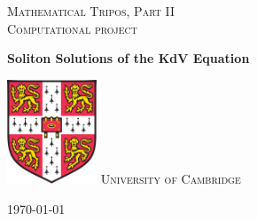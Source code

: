 \documentclass[a4paper,11pt]{article}
\begin{document}
\lstset{language = Matlab}
\begin{titlepage} %
	
	\center %
	
	\vspace*{3cm}

	\textsc{Mathematical Tripos, Part II}\\
	\textsc{Computational project}
	\begin{center}
      {\huge\bfseries Soliton Solutions of the KdV Equation\\[0.4cm]
}     \end{center}
	
	\vfill
	\vfill\vfill\vfill\vfill
	\includegraphics*[width = 2.675cm, height = 3.1cm]{coat.png}
	\vfill
    \textsc{University of Cambridge}
	
	\vspace*{\fill}
	\vfill
	{\large\today} 
	\vfill
	
\end{titlepage}
\setcounter{tocdepth}{3}
\tableofcontents
\newpage
\end{document}
